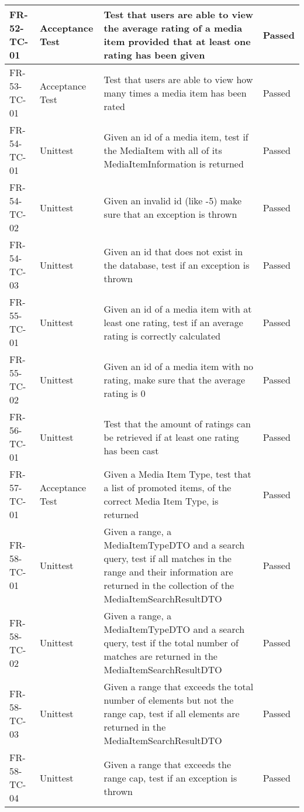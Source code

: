 \documentclass[../report.tex]{subfiles}
\begin{document}
\begin{longtable}{|L{2.1cm}|L{3cm}|C{7.5cm}|L{3cm}|}
FR-52-TC-01&Acceptance Test&Test that users are able to view the average rating of a media item provided that at least one rating has been given&Passed  \\ \hline
FR-53-TC-01&Acceptance Test&Test that users are able to view how many times a media item has been rated&Passed  \\ \hline
FR-54-TC-01&Unittest&Given an id of a media item, test if the MediaItem with all of its MediaItemInformation is returned&Passed  \\ \hline
FR-54-TC-02&Unittest&Given an invalid id (like -5) make sure that an exception is thrown&Passed  \\ \hline
FR-54-TC-03&Unittest&Given an id that does not exist in the database, test if an exception is thrown&Passed  \\ \hline
FR-55-TC-01&Unittest&Given an id of a media item with at least one rating, test if an average rating is correctly calculated &Passed  \\ \hline
FR-55-TC-02&Unittest&Given an id of a media item with no rating, make sure that the average rating is 0&Passed  \\ \hline
FR-56-TC-01&Unittest&Test that the amount of ratings can be retrieved if at least one rating has been cast&Passed  \\ \hline
FR-57-TC-01&Acceptance Test&Given a Media Item Type, test that a list of promoted items, of the correct Media Item Type, is returned&Passed  \\ \hline
FR-58-TC-01&Unittest&Given a range, a MediaItemTypeDTO and a search query, test if all matches in the range and their information are returned in the collection of the MediaItemSearchResultDTO&Passed  \\ \hline
FR-58-TC-02&Unittest&Given a range, a MediaItemTypeDTO and a search query, test if the total number of matches are returned in the MediaItemSearchResultDTO&Passed  \\ \hline
FR-58-TC-03&Unittest&Given a range that exceeds the total number of elements but not the range cap, test if all elements are returned in the MediaItemSearchResultDTO&Passed  \\ \hline
FR-58-TC-04&Unittest&Given a range that exceeds the range cap, test if an exception is thrown&Passed  \\ \hline

\end{longtable}
\end{document}
